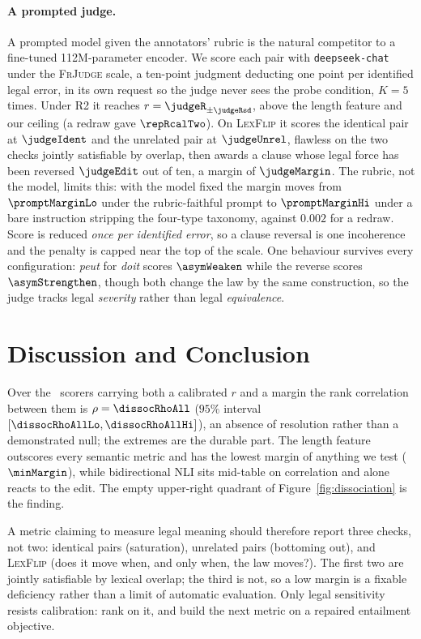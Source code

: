 \documentclass[11pt]{article}
\begin{document}
\paragraph{A prompted judge.}
A prompted model given the annotators' rubric \citep{enguehard2025lemaj} is the
natural competitor to a fine-tuned 112M-parameter encoder. We score each pair
with \texttt{deepseek-chat} under the \textsc{FrJudge} scale, a ten-point
judgment deducting one point per identified legal error, in its own request so
the judge never sees the probe condition, $K=5$ times. Under R2 it
reaches $r=\judgeR_{\pm\judgeRsd}$, above the length feature and our ceiling (a
redraw gave $\repRcalTwo$). On \textsc{LexFlip} it scores the identical pair
at $\judgeIdent$ and the unrelated pair at $\judgeUnrel$, flawless on the two
checks jointly satisfiable by overlap, then awards a clause whose legal force
has been reversed $\judgeEdit$ out of ten, a margin of $\judgeMargin$. The
rubric, not the model, limits this: with the model fixed the margin moves from
$\promptMarginLo$ under the rubric-faithful prompt to $\promptMarginHi$ under a
bare instruction stripping the four-type taxonomy, against $0.002$ for a redraw.
Score is reduced \emph{once per identified error}, so a clause reversal is one
incoherence and the penalty is capped near the top of the scale. One behaviour
survives every configuration: \emph{peut} for \emph{doit} scores $\asymWeaken$
while the reverse scores $\asymStrengthen$, though both change the law by the
same construction, so the judge tracks legal \emph{severity} rather than legal
\emph{equivalence}.

\section{Discussion and Conclusion}
\label{sec:discussion}

Over the \nDissocAll\ scorers carrying both a calibrated $r$ and a margin the
rank correlation between them is $\rho=\dissocRhoAll$ ($95\%$ interval
$[\dissocRhoAllLo, \dissocRhoAllHi]$), an absence of resolution rather than a
demonstrated null; the extremes are the durable part. The length feature
outscores every semantic metric and has the lowest margin of anything we test
($\minMargin$), while bidirectional NLI sits mid-table on correlation and alone
reacts to the edit. The empty upper-right quadrant of
Figure~\ref{fig:dissociation} is the finding.

A metric claiming to measure legal meaning should therefore report three checks,
not two: identical pairs (saturation), unrelated pairs (bottoming out), and
\textsc{LexFlip} (does it move when, and only when, the law moves?). The first
two are jointly satisfiable by lexical overlap; the third is not, so a low
margin is a fixable deficiency rather than a limit of automatic evaluation. Only
legal sensitivity resists calibration: rank on it, and build the next metric on
a repaired entailment objective.
\end{document}
